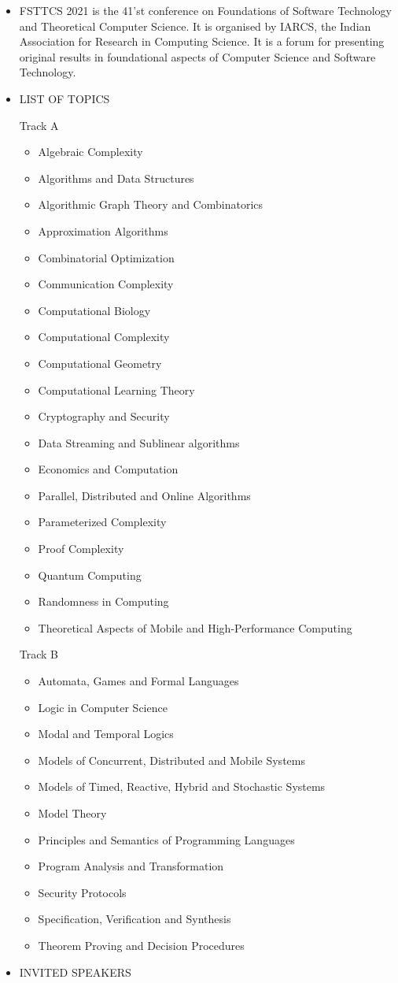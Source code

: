 \documentclass[prodmode,acmtecs]{acmsmall} %
\begin{document}
\begin{itemize}\item  FSTTCS 2021 is the 41’st conference on Foundations of Software Technology and Theoretical Computer Science. It is organised by IARCS, the Indian Association for Research in Computing Science. It is a forum for presenting original results in foundational aspects of Computer Science and Software Technology. 
 
\item  LIST OF TOPICS 
 
  Track A 
 
\begin{itemize}\item  Algebraic Complexity
\item  Algorithms and Data Structures
\item  Algorithmic Graph Theory and Combinatorics
\item  Approximation Algorithms
\item  Combinatorial Optimization
\item  Communication Complexity
\item  Computational Biology
\item  Computational Complexity
\item  Computational Geometry
\item  Computational Learning Theory
\item  Cryptography and Security
\item  Data Streaming and Sublinear algorithms
\item  Economics and Computation
\item  Parallel, Distributed and Online Algorithms
\item  Parameterized Complexity
\item  Proof Complexity
\item  Quantum Computing
\item  Randomness in Computing
\item  Theoretical Aspects of Mobile and High-Performance Computing
\end{itemize} 
  Track B 
 
\begin{itemize}\item  Automata, Games and Formal Languages
\item  Logic in Computer Science
\item  Modal and Temporal Logics
\item  Models of Concurrent, Distributed and Mobile Systems
\item  Models of Timed, Reactive, Hybrid and Stochastic Systems
\item  Model Theory
\item  Principles and Semantics of Programming Languages
\item  Program Analysis and Transformation
\item  Security Protocols
\item  Specification, Verification and Synthesis
\item  Theorem Proving and Decision Procedures
\end{itemize} 
\item  INVITED SPEAKERS 
 

\end{itemize}
\end{document}
